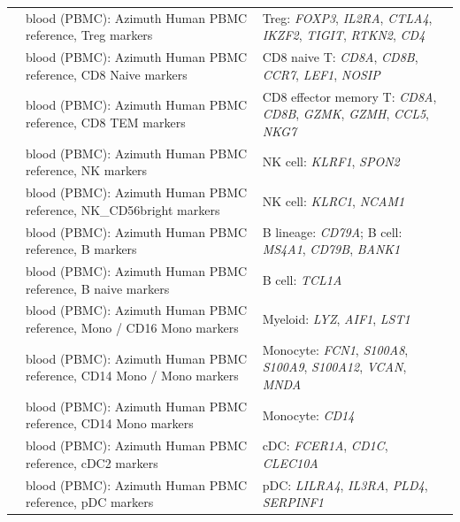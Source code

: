\begin{longtable}{@{}>{\raggedright\arraybackslash}p{2.0cm} >{\raggedright\arraybackslash}p{4.6cm} >{\raggedright\arraybackslash}p{8.4cm}@{}}
\cite{haoIntegratedAnalysisMultimodal2021} & blood (PBMC): Azimuth Human PBMC reference, Treg markers & Treg: \textit{FOXP3}, \textit{IL2RA}, \textit{CTLA4}, \textit{IKZF2}, \textit{TIGIT}, \textit{RTKN2}, \textit{CD4} \\
\cite{haoIntegratedAnalysisMultimodal2021} & blood (PBMC): Azimuth Human PBMC reference, CD8 Naive markers & CD8 naive T: \textit{CD8A}, \textit{CD8B}, \textit{CCR7}, \textit{LEF1}, \textit{NOSIP} \\
\cite{haoIntegratedAnalysisMultimodal2021} & blood (PBMC): Azimuth Human PBMC reference, CD8 TEM markers & CD8 effector memory T: \textit{CD8A}, \textit{CD8B}, \textit{GZMK}, \textit{GZMH}, \textit{CCL5}, \textit{NKG7} \\
\cite{haoIntegratedAnalysisMultimodal2021} & blood (PBMC): Azimuth Human PBMC reference, NK markers & NK cell: \textit{KLRF1}, \textit{SPON2} \\
\cite{haoIntegratedAnalysisMultimodal2021} & blood (PBMC): Azimuth Human PBMC reference, NK\_CD56bright markers & NK cell: \textit{KLRC1}, \textit{NCAM1} \\
\cite{haoIntegratedAnalysisMultimodal2021} & blood (PBMC): Azimuth Human PBMC reference, B markers & B lineage: \textit{CD79A}; B cell: \textit{MS4A1}, \textit{CD79B}, \textit{BANK1} \\
\cite{haoIntegratedAnalysisMultimodal2021} & blood (PBMC): Azimuth Human PBMC reference, B naive markers & B cell: \textit{TCL1A} \\
\cite{haoIntegratedAnalysisMultimodal2021} & blood (PBMC): Azimuth Human PBMC reference, Mono / CD16 Mono markers & Myeloid: \textit{LYZ}, \textit{AIF1}, \textit{LST1} \\
\cite{haoIntegratedAnalysisMultimodal2021} & blood (PBMC): Azimuth Human PBMC reference, CD14 Mono / Mono markers & Monocyte: \textit{FCN1}, \textit{S100A8}, \textit{S100A9}, \textit{S100A12}, \textit{VCAN}, \textit{MNDA} \\
\cite{haoIntegratedAnalysisMultimodal2021} & blood (PBMC): Azimuth Human PBMC reference, CD14 Mono markers & Monocyte: \textit{CD14} \\
\cite{haoIntegratedAnalysisMultimodal2021} & blood (PBMC): Azimuth Human PBMC reference, cDC2 markers & cDC: \textit{FCER1A}, \textit{CD1C}, \textit{CLEC10A} \\
\cite{haoIntegratedAnalysisMultimodal2021} & blood (PBMC): Azimuth Human PBMC reference, pDC markers & pDC: \textit{LILRA4}, \textit{IL3RA}, \textit{PLD4}, \textit{SERPINF1} \\

\end{longtable}
